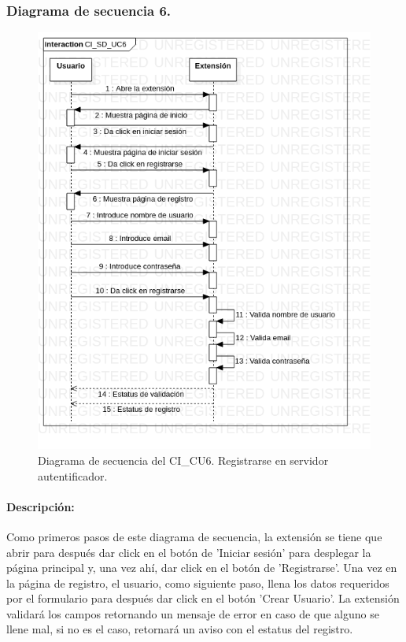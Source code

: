 \documentclass[12pt, a4paper, titlepage]{report}
\begin{document}
        		\subsubsection{Diagrama de secuencia 6.}
        			\begin{figure}[H]
        				\begin{center}    		    	\includegraphics[height=14cm]{./imagenes/Disenio/Componente_1/CI_SD_UC6.png}
        				\caption[Diagrama de secuencia 6 del Componente I]{Diagrama de secuencia del CI\_CU6. Registrarse en servidor autentificador.}
        				\end{center}
        			\end{figure}
        			
        			\paragraph{Descripción:}	
    			         Como primeros pasos de este diagrama de secuencia, la extensión se tiene que abrir para después dar click en el botón de 'Iniciar sesión' para desplegar la página principal y, una vez ahí, dar click en el botón de 'Registrarse'. Una vez en la página de registro, el usuario, como siguiente paso, llena los datos requeridos por el formulario para después dar click en el botón 'Crear Usuario'. La extensión validará los campos retornando un mensaje de error en caso de que alguno se llene mal, si no es el caso, retornará un aviso con el estatus del registro.
    			
\end{document}
